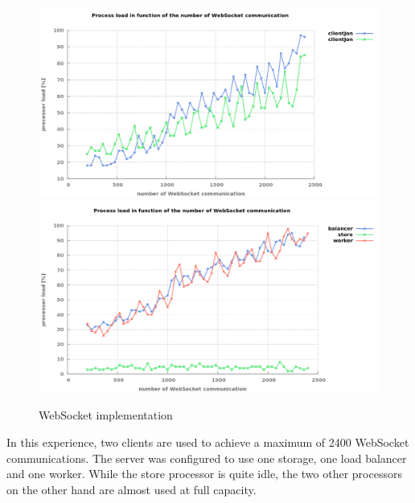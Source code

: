 \begin{figure}[H]
	\centering
		\includegraphics[width=\textwidth]{./Figures/WS_client_comparaison.png}
		\includegraphics[width=\textwidth]{./Figures/WS_server_comparaison.png}
	\caption[WS_comparaison]{WebSocket implementation}
	\label{fig:WS_comparaison}
\end{figure}

In this experience, two clients are used to achieve a maximum of 2400 WebSocket
communications.  The server was configured to use one storage, one load
balancer and one worker. While the store processor is quite idle, the two other
processors on the other hand are almost used at full capacity.

